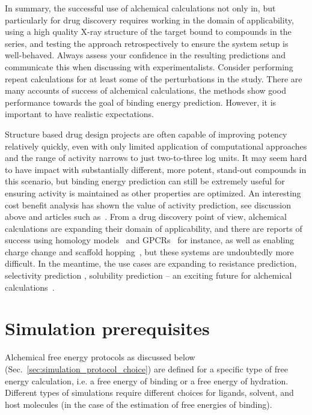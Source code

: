 \documentclass[9pt,bestpractices]{livecoms}
\begin{document}
In summary, the successful use of alchemical calculations not only in, but particularly for drug discovery requires working in the domain of applicability, using a high quality X-ray structure of the target bound to compounds in the series, and testing the approach retrospectively to ensure the system setup is well-behaved. Always assess your confidence in the resulting predictions and communicate this when discussing with experimentalists. Consider performing repeat calculations for at least some of the perturbations in the study. 
 There are many accounts of success of alchemical calculations, the methods show good performance towards the goal of binding energy prediction. However, it is important to have realistic expectations. 

Structure based drug design projects are often capable of improving potency relatively quickly, even with only limited application of computational approaches and the range of activity narrows to just two-to-three log units. It may seem hard to have impact with substantially different, more potent, stand-out compounds in this scenario, but binding energy prediction can still be extremely useful for ensuring activity is maintained as other properties are optimized. An interesting cost benefit analysis has shown the value of activity prediction, see discussion above and articles such as~\cite{mobley2012perspective}. 
From a drug discovery point of view, alchemical calculations are expanding their domain of applicability, and there are reports of success using homology models~\cite{cappel2016relative} and GPCRs~\cite{deflorian2020accurate,lenselink2016predicting} for instance, as well as enabling charge change and scaffold hopping~\cite{chen2018accurate, wang2017accurate}, but these systems are undoubtedly more difficult. In the meantime, the use cases are expanding to resistance prediction, selectivity prediction , solubility prediction – an exciting future for alchemical calculations~\cite{hauser2018predicting, albanese2020structure, mondal2019free}. 

%
%
\section{Simulation prerequisites}
\label{sec:prerequisites}
Alchemical free energy protocols as discussed below (Sec.~\ref{sec:simulation_protocol_choice}) are defined for a specific type of free energy calculation, i.e. a free energy of binding or a free energy of hydration. Different types of simulations require different choices for ligands, solvent, and host molecules (in the case of the estimation of free energies of binding).
\end{document}
